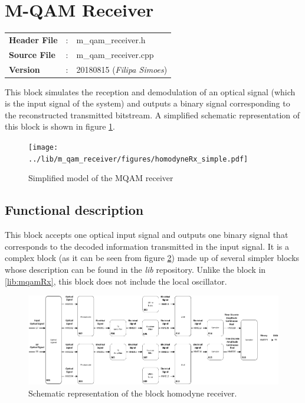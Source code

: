 \clearpage

\section{M-QAM Receiver}\label{lib:homodyneRx}

\begin{tcolorbox}	
	\begin{tabular}{p{2.75cm} p{0.2cm} p{10.5cm}} 	
		\textbf{Header File}   &:& m\_qam\_receiver.h \\
		\textbf{Source File}   &:& m\_qam\_receiver.cpp \\
        \textbf{Version}       &:& 20180815 (\emph{Filipa Simoes})\\
        
        
	\end{tabular}
\end{tcolorbox}

This block simulates the reception and demodulation of an optical
signal (which is the input signal of the system) and outputs a binary signal
corresponding to the reconstructed transmitted bitstream.
 A simplified schematic representation of this block is shown in
figure
\ref{fig:homodyneRx_simple}.

\begin{figure}[h]
	\centering
	\texttt{[image: ../lib/m\_qam\_receiver/figures/homodyneRx\_simple.pdf]}
	\caption{Simplified model of the MQAM
	receiver}\label{fig:homodyneRx_simple}
\end{figure}

\subsection*{Functional description}

This block accepts one optical input signal and outputs one binary signal that
corresponds to the decoded information transmitted in the input signal. It is a
complex
block (as it can be seen from figure \ref{fig:homodyneRx_blocks}) made up of
several simpler blocks whose description can be found in the
\textit{lib} repository. Unlike the block in \ref{lib:mqamRx}, this block does
not include the local oscillator.

\begin{figure}[h]
	\centering
	\includegraphics[width=\textwidth]{../lib/m_qam_receiver/figures/homodyneRx_blocks.pdf}
	\caption{Schematic representation of the block homodyne
	receiver.}\label{fig:homodyneRx_blocks}
\end{figure}

